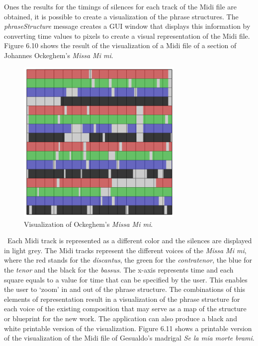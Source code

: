 Ones the results for the timings of silences for each track of the Midi file are obtained, it is possible to create a visualization of the phrase structures. The \emph{phraseStructure} message creates a GUI window that displays this information by converting time values to pixels to create a visual representation of the Midi file. Figure 6.10 shows the result of the visualization of a Midi file of a section of Johannes Ockeghem's \emph{Missa Mi mi}. 
\begin{figure}[htbp] %
   \centering
   \includegraphics[width=8cm]{Chapter6/midi_phrase.tif} %
   \caption{Visualization of Ockeghem's \emph{Missa Mi mi}.}
   \label{fig:example}
\end{figure}\
Each Midi track is represented as a different color and the silences are displayed in light grey. The Midi tracks represent the different voices of the \emph{Missa Mi mi}, where the red stands for the \emph{discantus}, the green for the \emph{contratenor}, the blue for the \emph{tenor} and the black for the \emph{bassus}. The x-axis represents time and each square equals to a value for time that can be specified by the user. This enables the user to `zoom' in and out of the phrase structure. The combinations of this elements of representation result in a visualization of the phrase structure for each voice of the existing composition that may serve as a map of the structure or blueprint for the new work. The application can also produce a black and white printable version of the visualization. Figure 6.11 shows a printable version of the visualization of the Midi file of Gesualdo's madrigal \emph{Se la mia morte brami}. 
